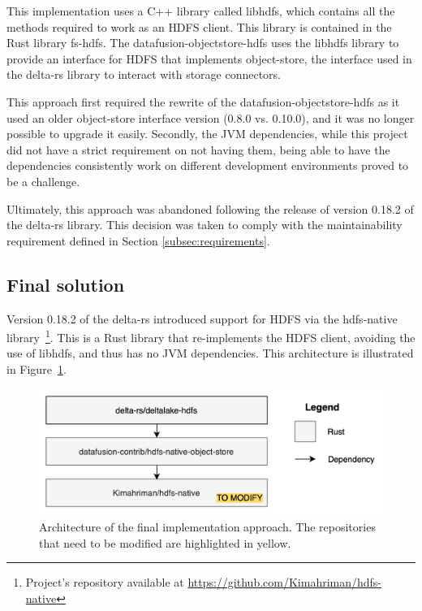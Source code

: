 This implementation uses a C++ library called libhdfs, which contains all the methods required to work as an \gls{HDFS} client. This library is contained in the Rust library fs-hdfs. The datafusion-objectstore-hdfs uses the libhdfs library to provide an interface for \gls{HDFS} that implements object-store, the interface used in the delta-rs library to interact with storage connectors.

This approach first required the rewrite of the datafusion-objectstore-hdfs as it used an older object-store interface version (0.8.0 vs. 0.10.0), and it was no longer possible to upgrade it easily. Secondly, the \gls{JVM} dependencies, while this project did not have a strict requirement on not having them, being able to have the dependencies consistently work on different development environments proved to be a challenge. 

Ultimately, this approach was abandoned following the release of version 0.18.2 of the delta-rs library. This decision was taken to comply with the maintainability requirement defined in Section \ref{subsec:requirements}.

\subsection{Final solution}

Version 0.18.2 of the delta-rs introduced support for \gls{HDFS} via the hdfs-native library~\footnote{Project's repository available at \url{https://github.com/Kimahriman/hdfs-native}}. This is a Rust library that re-implements the \gls{HDFS} client, avoiding the use of libhdfs, and thus has no \gls{JVM} dependencies. This architecture is illustrated in Figure~\ref{fig:approach_2_solution_schema}.

\begin{figure}[!ht]
  \begin{center}
    \includegraphics[width=\textwidth]{figures/4-implementation/hdfs-native.png}
  \caption[Final solution architecture]{Architecture of the final implementation approach. The repositories that need to be modified are highlighted in yellow.}
  \label{fig:approach_2_solution_schema}
  \end{center}
\end{figure}

